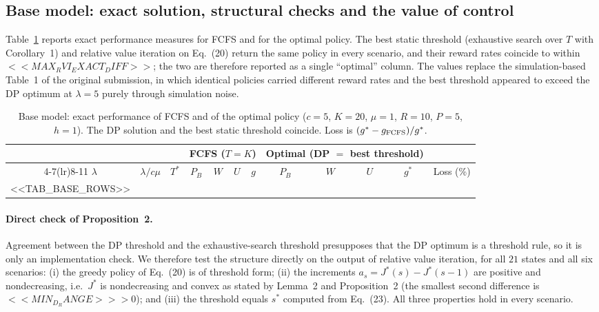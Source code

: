 \subsection{Base model: exact solution, structural checks and the value of control}\label{sec:num-exact}

Table~\ref{tab:base-exact} reports exact performance measures for FCFS and for the optimal policy. The best static threshold (exhaustive search over $T$ with Corollary~1) and relative value iteration on Eq.~(20) return the same policy in every scenario, and their reward rates coincide to within $<<MAX_RVI_EXACT_DIFF>>$; the two are therefore reported as a single ``optimal'' column. The values replace the simulation-based Table~1 of the original submission, in which identical policies carried different reward rates and the best threshold appeared to exceed the DP optimum at $\lambda=5$ purely through simulation noise.

\begin{table}[t]
\centering\small
\caption{Base model: exact performance of FCFS and of the optimal policy ($c=5$, $K=20$, $\mu=1$, $R=10$, $P=5$, $h=1$). The DP solution and the best static threshold coincide. Loss is $(g^*-g_{\rm FCFS})/g^*$.}\label{tab:base-exact}
\begin{tabular}{@{}cc c cccc cccc c@{}}
\toprule
 & & & \multicolumn{4}{c}{FCFS ($T=K$)} & \multicolumn{4}{c}{Optimal (DP $=$ best threshold)} & \\
\cmidrule(lr){4-7}\cmidrule(lr){8-11}
$\lambda$ & $\lambda/c\mu$ & $T^*$ & $P_B$ & $W$ & $U$ & $g$ & $P_B$ & $W$ & $U$ & $g^*$ & Loss (\%)\\
\midrule
<<TAB_BASE_ROWS>>
\bottomrule
\end{tabular}
\end{table}

\paragraph{Direct check of Proposition~2.} Agreement between the DP threshold and the exhaustive-search threshold presupposes that the DP optimum is a threshold rule, so it is only an implementation check. We therefore test the structure directly on the output of relative value iteration, for all $21$ states and all six scenarios: (i) the greedy policy of Eq.~(20) is of threshold form; (ii) the increments $a_s=J^*(s)-J^*(s-1)$ are positive and nondecreasing, i.e.\ $J^*$ is nondecreasing and convex as stated by Lemma~2 and Proposition~2 (the smallest second difference is $<<MIN_D_RANGE>>>0$); and (iii) the threshold equals $s^*$ computed from Eq.~(23). All three properties hold in every scenario.

